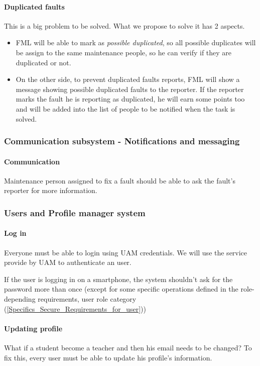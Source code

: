 \paragraph{Duplicated faults} This is a big problem to be solved. What we propose to solve it has 2 aspects.
\begin{itemize}
\item FML will be able to mark as \textit{possible duplicated}, so all possible duplicates will be assign to the same maintenance people, so he can verify if they are duplicated or not.

\item On the other side, to prevent duplicated faults reports, FML will show a message showing possible duplicated faults to the reporter. If the reporter marks the fault he is reporting as duplicated, he will earn some points too and will be added into the list of people to be notified when the task is solved.
\end{itemize}


\subsubsection{Communication subsystem - Notifications and messaging}

\paragraph{Communication} Maintenance person assigned to fix a fault should be able to ask the fault's reporter for more information.


\subsubsection{Users and Profile manager system}

\paragraph{Log in} Everyone must be able to login using UAM credentials. We will use the service provide by UAM to authenticate an user.

If the user is logging in on a smartphone, the system shouldn't ask for the password more than once (except for some specific operations defined in the role-depending requirements, user role category (\ref{Specifics_Secure_Requirements_for_user}))

\paragraph{Updating profile} What if a student become a teacher and then his email needs to be changed? To fix this, every user must be able to update his profile's information.


